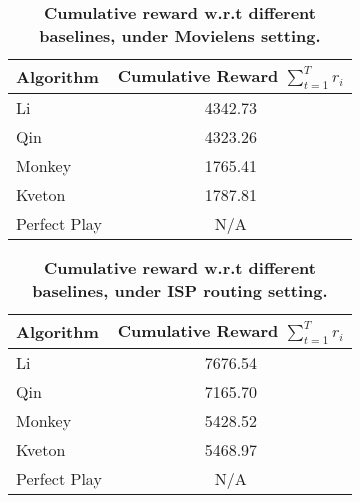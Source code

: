 \documentclass[a4paper,11pt]{article}
\begin{document}
\begin{table}
    \centering
    \renewcommand{\arraystretch}{1.2}
	\begin{tabular}{lc}
	    \toprule
		\textbf{Algorithm}  &\textbf{Cumulative Reward $\sum_{t=1}^Tr_i $}\\
		\midrule
		Li		    &4342.73 \\
		Qin		    &4323.26 \\
		Monkey		    &1765.41 \\
		Kveton		    &1787.81 \\
		Perfect Play		    &N/A \\
		\bottomrule
	\end{tabular}
	\caption{\textbf{Cumulative reward w.r.t different baselines, under Movielens setting.}}
	\label{movielens}
\end{table}

\begin{table}
    \centering
    \renewcommand{\arraystretch}{1.2}
	\begin{tabular}{lc}
	    \toprule
		\textbf{Algorithm}  &\textbf{Cumulative Reward $\sum_{t=1}^Tr_i $}\\
		\midrule
		Li		    &7676.54 \\
		Qin		    &7165.70 \\
		Monkey		    &5428.52 \\
		Kveton		    &5468.97 \\
		Perfect Play		    &N/A \\
		\bottomrule
	\end{tabular}
	\caption{\textbf{Cumulative reward w.r.t different baselines, under ISP routing setting.}}
	\label{isp}
\end{table}
\end{document}

